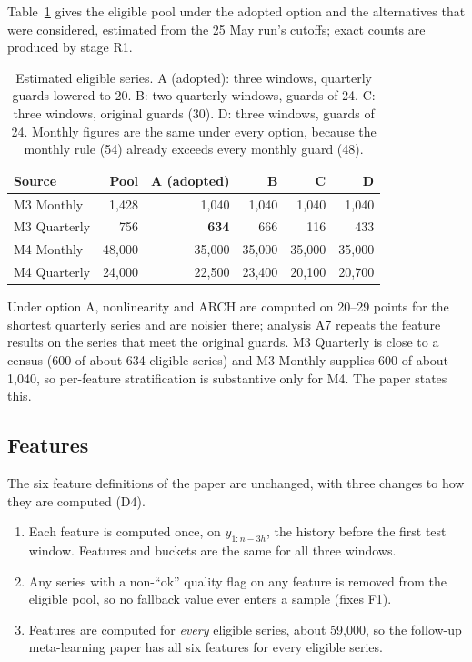 \documentclass[11pt,a4paper]{article}
\begin{document}
Table~\ref{tab:eligible} gives the eligible pool under the adopted option and the alternatives that
were considered, estimated from the 25 May run's cutoffs; exact counts are produced by stage R1.

\begin{table}[h]
\centering\small
\caption{Estimated eligible series. A (adopted): three windows, quarterly guards lowered to 20.
B: two quarterly windows, guards of 24. C: three windows, original guards (30). D: three windows,
guards of 24. Monthly figures are the same under every option, because the monthly rule (54)
already exceeds every monthly guard (48).}\label{tab:eligible}
\begin{tabular}{@{}lrrrrr@{}}
\toprule
Source & Pool & A (adopted) & B & C & D \\
\midrule
M3 Monthly   & 1,428  & 1,040  & 1,040  & 1,040  & 1,040 \\
M3 Quarterly & 756    & \textbf{634} & 666 & 116 & 433 \\
M4 Monthly   & 48,000 & 35,000 & 35,000 & 35,000 & 35,000 \\
M4 Quarterly & 24,000 & 22,500 & 23,400 & 20,100 & 20,700 \\
\bottomrule
\end{tabular}
\end{table}

Under option A, nonlinearity and ARCH are computed on 20--29 points for the shortest quarterly
series and are noisier there; analysis A7 repeats the feature results on the series that meet the
original guards. M3 Quarterly is close to a census (600 of about 634 eligible series) and M3
Monthly supplies 600 of about 1,040, so per-feature stratification is substantive only for M4. The
paper states this.

\subsection{Features}

The six feature definitions of the paper are unchanged, with three changes to how they are computed
(D4).
\begin{enumerate}
  \item Each feature is computed once, on $y_{1:n-3h}$, the history before the first test window.
  Features and buckets are the same for all three windows.
  \item Any series with a non-``ok'' quality flag on any feature is removed from the eligible pool,
  so no fallback value ever enters a sample (fixes F1).
  \item Features are computed for \emph{every} eligible series, about 59,000, so the follow-up
  meta-learning paper has all six features for every eligible series.
\end{enumerate}
\end{document}
